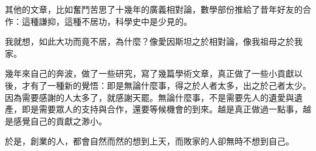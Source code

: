 \begin{acknowledgement}
\begin{tempsection}
其他的文章，比如奮鬥苦思了十幾年的廣義相對論，數學部份推給了昔年好友的合作：這種謙抑，這種不居功，科學史中是少見的。

我就想，如此大功而竟不居，為什麼？像愛因斯坦之於相對論，像我祖母之於我家。

幾年來自己的奔波，做了一些研究，寫了幾篇學術文章，真正做了一些小貢獻以後，才有了一種新的覺悟：即是無論什麼事，得之於人者太多，出之於己者太少。因為需要感謝的人太多了，就感謝天罷。無論什麼事，不是需要先人的遺愛與遺產，即是需要眾人的支持與合作，還要等候機會的到來。越是真正做過一點事，越是感覺自己的貢獻之渺小。

於是，創業的人，都會自然而然的想到上天，而敗家的人卻無時不想到自己。

\end{tempsection}

\end{acknowledgement}